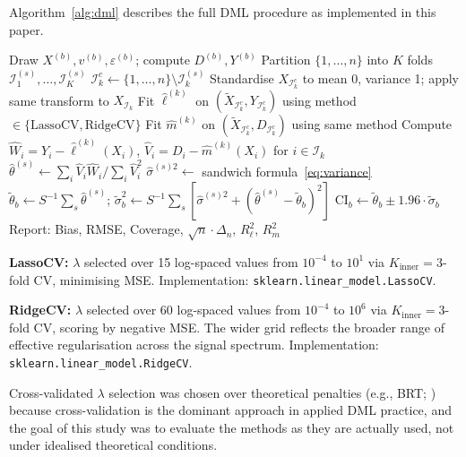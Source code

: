 \documentclass[a4paper,10.5pt]{article}
\begin{document}
Algorithm~\ref{alg:dml} describes the full DML procedure as implemented in this paper.

\begin{algorithm}[H]
\caption{DML Estimation with Cross-Fitting}\label{alg:dml}
\begin{algorithmic}[1]
 
    \State Draw $X^{(b)}, v^{(b)}, \varepsilon^{(b)}$; compute $D^{(b)}, Y^{(b)}$
     
        \State Partition $\{1, \ldots, n\}$ into $K$ folds $\mathcal{I}_1^{(s)}, \ldots, \mathcal{I}_K^{(s)}$
            \State $\mathcal{I}^c_k \gets \{1, \ldots, n\} \setminus \mathcal{I}_k^{(s)}$
            \State Standardise $X_{\mathcal{I}^c_k}$ to mean 0, variance 1; apply same transform to $X_{\mathcal{I}_k}$
            \State Fit $\hat{\ell}^{(k)}$ on $(\tilde{X}_{\mathcal{I}^c_k}, Y_{\mathcal{I}^c_k})$ using method $\in \{\text{LassoCV}, \text{RidgeCV}\}$
            \State Fit $\hat{m}^{(k)}$ on $(\tilde{X}_{\mathcal{I}^c_k}, D_{\mathcal{I}^c_k})$ using same method
            \State Compute $\hat{W}_i = Y_i - \hat{\ell}^{(k)}(X_i)$, $\hat{V}_i = D_i - \hat{m}^{(k)}(X_i)$ for $i \in \mathcal{I}_k$
        \EndFor
        \State $\hat{\theta}^{(s)} \gets \sum_i \hat{V}_i \hat{W}_i / \sum_i \hat{V}_i^2$
        \State $\hat{\sigma}^{(s)2} \gets$ sandwich formula~\eqref{eq:variance}
    \EndFor
    \State $\tilde{\theta}_b \gets S^{-1}\sum_s \hat{\theta}^{(s)}$; $\tilde{\sigma}^2_b \gets S^{-1}\sum_s[\hat{\sigma}^{(s)2} + (\hat{\theta}^{(s)} - \tilde{\theta}_b)^2]$
    \State $\text{CI}_b \gets \tilde{\theta}_b \pm 1.96 \cdot \tilde{\sigma}_b$
\EndFor
\State Report: Bias, RMSE, Coverage, $\sqrt{n}\cdot\Delta_n$, $R^2_\ell$, $R^2_m$
\end{algorithmic}
\end{algorithm}

\noindent\textbf{LassoCV:} $\lambda$ selected over 15 log-spaced values from $10^{-4}$ to $10^1$ via $K_{\text{inner}} = 3$-fold CV, minimising MSE. Implementation: \texttt{sklearn.linear\_model.LassoCV}.

\noindent\textbf{RidgeCV:} $\lambda$ selected over 60 log-spaced values from $10^{-4}$ to $10^6$ via $K_{\text{inner}} = 3$-fold CV, scoring by negative MSE. The wider grid reflects the broader range of effective regularisation across the signal spectrum. Implementation: \texttt{sklearn.linear\_model.RidgeCV}.

Cross-validated $\lambda$ selection was chosen over theoretical penalties (e.g., BRT; \citealt{belloni2014}) because cross-validation is the dominant approach in applied DML practice, and the goal of this study was to evaluate the methods as they are actually used, not under idealised theoretical conditions.
\end{document}
